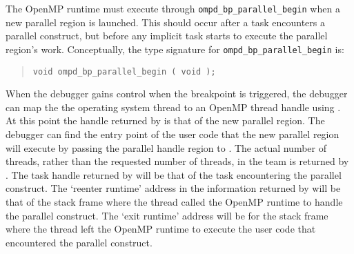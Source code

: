 The OpenMP runtime must execute through
\texttt{ompd\_bp\_parallel\_begin} when a new parallel region is launched.
This should occur after a task encounters a parallel construct,
but before any implicit task starts to execute the parallel
region's work.
Conceptually, the type signature for \texttt{ompd\_bp\_parallel\_begin} is:
\begin{quote}
\begin{lstlisting}
void ompd_bp_parallel_begin ( void );
\end{lstlisting}
\end{quote}

When the debugger gains control when the breakpoint is triggered,
the debugger can map the the operating system thread to an OpenMP
thread handle using
.
At this point the handle returned by
is that of the new parallel region.
The debugger can find the entry point of the user code that
the new parallel region will execute by passing the parallel handle region
to .
The actual number of threads, rather than the requested number of threads,
in the team is returned by
.
The task handle returned by
will be that of the task encountering the parallel construct.
The `reenter runtime' address in the information returned by
will be that of the stack frame where the thread called the OpenMP
runtime to handle the parallel construct.
The `exit runtime' address will be for the stack frame where the thread
left the OpenMP runtime to execute the user code that encountered
the parallel construct.

